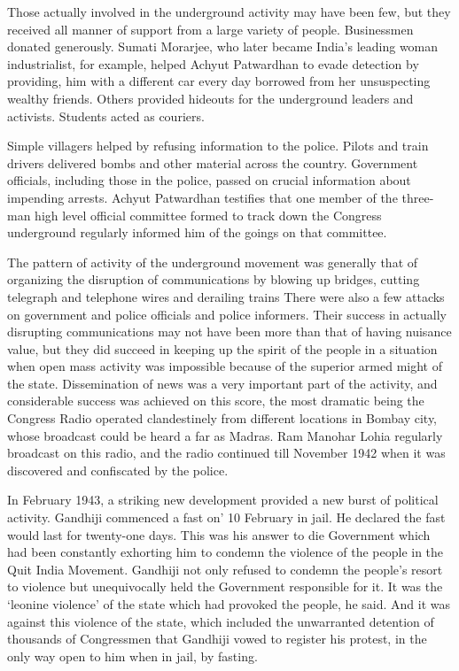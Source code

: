 \begin{multicols}{2}
Those actually involved in the underground activity may have been few, but they received all manner of support from a large variety of people. Businessmen donated generously. Sumati Morarjee, who later became India's leading woman industrialist, for example, helped Achyut Patwardhan to evade detection by providing, him with a different car every day borrowed from her unsuspecting wealthy friends. Others provided hideouts for the underground leaders and activists. Students acted as couriers.

Simple villagers helped by refusing information to the police. Pilots and train drivers delivered bombs and other material across the country. Government officials, including those in the police, passed on crucial information about impending arrests. Achyut Patwardhan testifies that one member of the three-man high level official committee formed to track down the Congress underground regularly informed him of the goings on that committee.

The pattern of activity of the underground movement was generally that of organizing the disruption of communications by blowing up bridges, cutting telegraph and telephone wires and derailing trains There were also a few attacks on government and police officials and police informers. Their success in actually disrupting communications may not have been more than that of having nuisance value, but they did succeed in keeping up the spirit of the people in a situation when open mass activity was impossible because of the superior armed might of the state. Dissemination of news was a very important part of the activity, and considerable success was achieved on this score, the most dramatic being the Congress Radio operated clandestinely from different locations in Bombay city, whose broadcast could be heard a far as Madras. Ram Manohar Lohia regularly broadcast on this radio, and the radio continued till November 1942 when it was discovered and confiscated by the police.

In February 1943, a striking new development provided a new burst of political activity. Gandhiji commenced a fast on' 10 February in jail. He declared the fast would last for twenty-one days. This was his answer to die Government which had been constantly exhorting him to condemn the violence of the people in the Quit India Movement. Gandhiji not only refused to condemn the people's resort to violence but unequivocally held the Government responsible for it. It was the `leonine violence' of the state which had provoked the people, he said. And it was against this violence of the state, which included the unwarranted detention of thousands of Congressmen that Gandhiji vowed to register his protest, in the only way open to him when in jail, by fasting.


\end{multicols}
